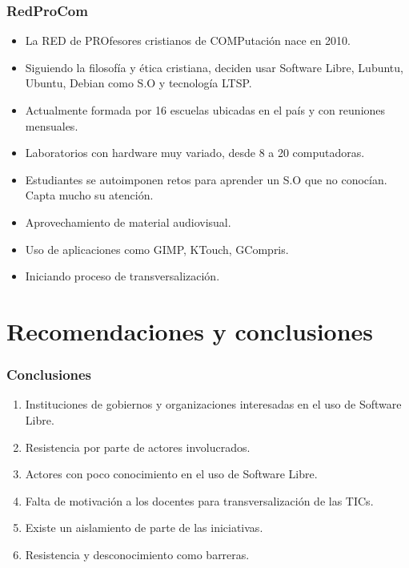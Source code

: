 \documentclass{beamer}
\begin{document}
\begin{frame}
\frametitle{RedProCom}
	\begin{itemize}
		\pause \item La \alert{RED de PROfesores cristianos de COMPutaci\'on} nace en 2010.
		\pause \item Siguiendo la filosof\'ia y \'etica cristiana, deciden usar Software Libre, Lubuntu, Ubuntu, Debian como S.O y tecnolog\'ia LTSP.
		\pause \item Actualmente formada por 16 escuelas ubicadas en el pa\'is y con reuniones mensuales.
		\pause \item Laboratorios con hardware muy variado, desde 8 a 20 computadoras.
		\pause \item Estudiantes se autoimponen retos para aprender un S.O que no conoc\'ian. Capta mucho su atenci\'on.
		\pause \item Aprovechamiento de material audiovisual.
		\pause \item Uso de aplicaciones como GIMP, KTouch, GCompris.
		\pause \item Iniciando proceso de transversalizaci\'on.
	\end{itemize}	
\end{frame}

\section {Recomendaciones y conclusiones}
\begin{frame}
\frametitle{Conclusiones}
	\begin{enumerate}	
		\pause \item Instituciones de gobiernos y organizaciones interesadas en el uso de Software Libre.
		\pause \item Resistencia por parte de actores involucrados.
		\pause \item Actores con poco conocimiento en el uso de Software Libre.
		\pause \item Falta de motivaci\'on a los docentes para transversalizaci\'on de las TICs.
		\pause \item Existe un aislamiento de parte de las iniciativas.
                \pause \item \alert{Resistencia} y \alert{desconocimiento} como barreras.
	\end{enumerate}
\end{frame}
\end{document}
